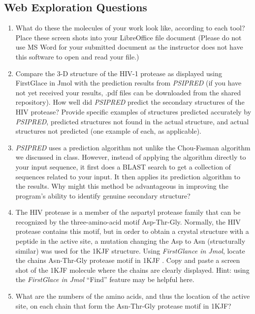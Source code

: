 \subsection*{Web Exploration Questions}

\begin{enumerate}
\item What do these the molecules of your work look like, according to each tool? Place these screen shots into your LibreOffice file document (Please do not use MS Word for your submitted document as the instructor does not have this software to open and read your file.)

\item Compare the 3-D structure of the HIV-1 protease as displayed using FirstGlace in Jmol with the prediction results from \emph{PSIPRED} (if you have not yet received your results, .pdf files can be downloaded from the shared repository).  How well did \emph{PSIPRED} predict the secondary structures of the HIV protease?  Provide specific examples of structures predicted accurately by \emph{PSIPRED}, predicted structures not found in the actual structure, and actual structures not predicted (one example of each, as applicable).

 \item \emph{PSIPRED} uses a prediction algorithm not unlike the Chou-Fasman algorithm we discussed in class. However, instead of applying the algorithm directly to your input sequence, it first does a BLAST search to get a collection of sequences related to your input.  It then applies its prediction algorithm to the results.  Why might this method be advantageous in improving the program's ability to identify genuine secondary structure?

 \item The HIV protease is a member of the aspartyl protease family that can be recognized by the three-amino-acid motif Asp-Thr-Gly.  Normally, the HIV protease contains this motif, but in order to obtain a crystal structure with a peptide in the active site, a mutation changing the Asp to Asn (structurally similar) was used for the \color{blue} 1KJF \color{black} structure.  Using \emph{FirstGlance in Jmol}, locate the chains Asn-Thr-Gly protease motif in \color{blue} 1KJF \color{black}. Copy and paste a screen shot of the \color{blue} 1KJF \color{black} molecule where the chains are clearly displayed. Hint: using the \emph{FirstGlace in Jmol} ``Find'' feature may be helpful here.

 \item What are the numbers of the amino acids, and thus the location of the active site, on each chain that form the Asn-Thr-Gly protease motif in \color{blue}1KJF\color{black}?  

\end{enumerate}



